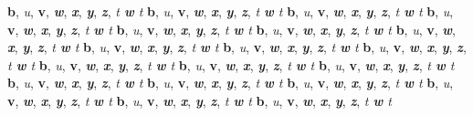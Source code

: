 
\def\mytitle{Edge Cases 2}


\textbf{b}, \emph{u}, \textbf{v}, \emph{\textbf{w}}, \emph{\textbf{x}}, \textbf{\emph{y}}, \textbf{\emph{z}}, \emph{t \textbf{w} t}
\textbf{b}, \emph{u}, \textbf{v}, \emph{\textbf{w}}, \emph{\textbf{x}}, \textbf{\emph{y}}, \textbf{\emph{z}}, \emph{t \textbf{w} t}
\textbf{b}, \emph{u}, \textbf{v}, \emph{\textbf{w}}, \emph{\textbf{x}}, \textbf{\emph{y}}, \textbf{\emph{z}}, \emph{t \textbf{w} t}
\textbf{b}, \emph{u}, \textbf{v}, \emph{\textbf{w}}, \emph{\textbf{x}}, \textbf{\emph{y}}, \textbf{\emph{z}}, \emph{t \textbf{w} t}
\textbf{b}, \emph{u}, \textbf{v}, \emph{\textbf{w}}, \emph{\textbf{x}}, \textbf{\emph{y}}, \textbf{\emph{z}}, \emph{t \textbf{w} t}
\textbf{b}, \emph{u}, \textbf{v}, \emph{\textbf{w}}, \emph{\textbf{x}}, \textbf{\emph{y}}, \textbf{\emph{z}}, \emph{t \textbf{w} t}
\textbf{b}, \emph{u}, \textbf{v}, \emph{\textbf{w}}, \emph{\textbf{x}}, \textbf{\emph{y}}, \textbf{\emph{z}}, \emph{t \textbf{w} t}
\textbf{b}, \emph{u}, \textbf{v}, \emph{\textbf{w}}, \emph{\textbf{x}}, \textbf{\emph{y}}, \textbf{\emph{z}}, \emph{t \textbf{w} t}
\textbf{b}, \emph{u}, \textbf{v}, \emph{\textbf{w}}, \emph{\textbf{x}}, \textbf{\emph{y}}, \textbf{\emph{z}}, \emph{t \textbf{w} t}
\textbf{b}, \emph{u}, \textbf{v}, \emph{\textbf{w}}, \emph{\textbf{x}}, \textbf{\emph{y}}, \textbf{\emph{z}}, \emph{t \textbf{w} t}
\textbf{b}, \emph{u}, \textbf{v}, \emph{\textbf{w}}, \emph{\textbf{x}}, \textbf{\emph{y}}, \textbf{\emph{z}}, \emph{t \textbf{w} t}
\textbf{b}, \emph{u}, \textbf{v}, \emph{\textbf{w}}, \emph{\textbf{x}}, \textbf{\emph{y}}, \textbf{\emph{z}}, \emph{t \textbf{w} t}
\textbf{b}, \emph{u}, \textbf{v}, \emph{\textbf{w}}, \emph{\textbf{x}}, \textbf{\emph{y}}, \textbf{\emph{z}}, \emph{t \textbf{w} t}
\textbf{b}, \emph{u}, \textbf{v}, \emph{\textbf{w}}, \emph{\textbf{x}}, \textbf{\emph{y}}, \textbf{\emph{z}}, \emph{t \textbf{w} t}
\textbf{b}, \emph{u}, \textbf{v}, \emph{\textbf{w}}, \emph{\textbf{x}}, \textbf{\emph{y}}, \textbf{\emph{z}}, \emph{t \textbf{w} t}
\textbf{b}, \emph{u}, \textbf{v}, \emph{\textbf{w}}, \emph{\textbf{x}}, \textbf{\emph{y}}, \textbf{\emph{z}}, \emph{t \textbf{w} t}
\textbf{b}, \emph{u}, \textbf{v}, \emph{\textbf{w}}, \emph{\textbf{x}}, \textbf{\emph{y}}, \textbf{\emph{z}}, \emph{t \textbf{w} t}
\textbf{b}, \emph{u}, \textbf{v}, \emph{\textbf{w}}, \emph{\textbf{x}}, \textbf{\emph{y}}, \textbf{\emph{z}}, \emph{t \textbf{w} t}
\textbf{b}, \emph{u}, \textbf{v}, \emph{\textbf{w}}, \emph{\textbf{x}}, \textbf{\emph{y}}, \textbf{\emph{z}}, \emph{t \textbf{w} t}
